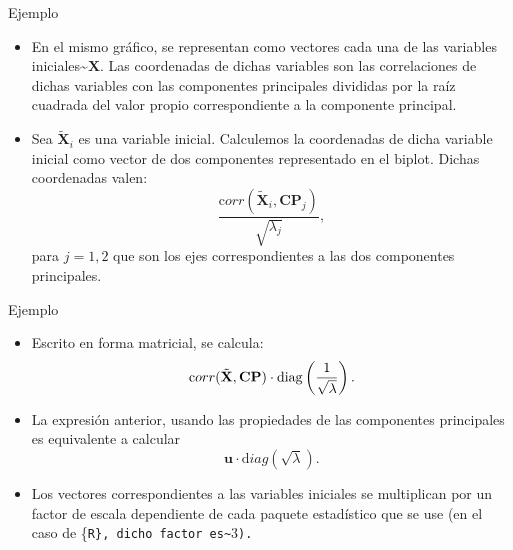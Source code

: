 \documentclass[
  spanish,
  ignorenonframetext,
]{beamer}
\providecommand{\tightlist}{%
  \setlength{\itemsep}{0pt}\setlength{\parskip}{0pt}}
\begin{document}
\begin{frame}{Ejemplo}
\protect\hypertarget{ejemplo-22}{}
\begin{itemize}
\tightlist
\item
  En el mismo gráfico, se representan como vectores cada una de las
  variables iniciales\textasciitilde{}\(\mathbf{X}\). Las coordenadas de
  dichas variables son las correlaciones de dichas variables con las
  componentes principales divididas por la raíz cuadrada del valor
  propio correspondiente a la componente principal.
\item
  Sea \(\tilde{\mathbf{X}}_i\) es una variable inicial. Calculemos la
  coordenadas de dicha variable inicial como vector de dos componentes
  representado en el biplot. Dichas coordenadas valen: \[
  \frac{{\mathrm corr}(\tilde{\mathbf{X}}_i,\mathbf{CP}_j)}{\sqrt{\lambda_j}},
  \] para \(j=1,2\) que son los ejes correspondientes a las dos
  componentes principales.
\end{itemize}
\end{frame}

\begin{frame}{Ejemplo}
\protect\hypertarget{ejemplo-23}{}
\begin{itemize}
\item
  Escrito en forma matricial, se calcula: \[
  {\mathrm corr}(\tilde{\mathbf{X}},\mathbf{CP})\cdot {\rm
  diag}\left(\frac{1}{\sqrt{\lambda}}\right).
  \]
\item
  La expresión anterior, usando las propiedades de las componentes
  principales es equivalente a calcular \[
  \mathbf{u}\cdot  {\mathrm diag}\left(\sqrt{\lambda}\right).
  \]
\item
  Los vectores correspondientes a las variables iniciales se multiplican
  por un factor de escala dependiente de cada paquete estadístico que se
  use (en el caso de \{\tt R\}, dicho factor es\textasciitilde{}\(3\)).
\end{itemize}
\end{frame}
\end{document}
